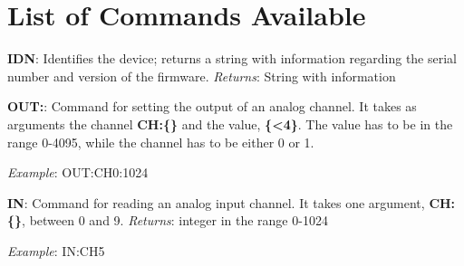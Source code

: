\section{List of Commands Available}\label{list-of-commandsavailable}
\textbf{{IDN}}: Identifies the device; returns a string with information
regarding the serial number and version of the firmware. \emph{Returns}:
String with information

\textbf{{OUT}:}: Command for setting the output of an analog channel. It
takes as arguments the channel \textbf{{CH}:\{\}} and the value,
\textbf{\{\textless{}4\}}. The value has to be in the range 0-4095,
while the channel has to be either 0 or 1.

\emph{Example}: {OUT}:{CH0}:1024

\textbf{{IN}}: Command for reading an analog input channel. It takes one
argument, \textbf{{CH}:\{\}}, between 0 and 9. \emph{Returns}: integer
in the range 0-1024

\emph{Example}: {IN}:{CH5}
